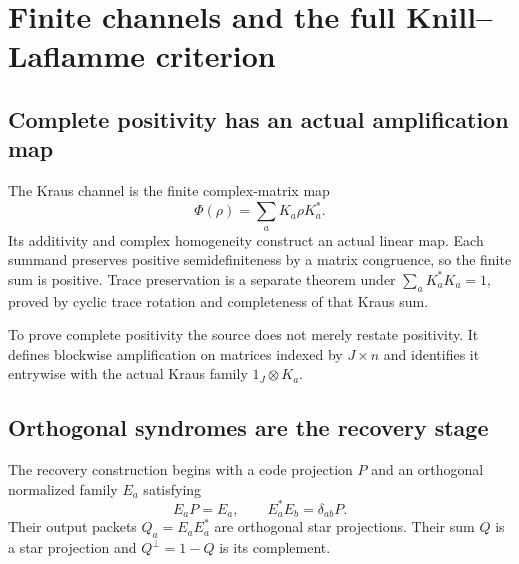 \section{Finite channels and the full Knill--Laflamme criterion}
\label{sec:recovery}

\subsection{Complete positivity has an actual amplification map}
The Kraus channel is the finite complex-matrix map
\[
\Phi(\rho)=\sum_aK_a\rho K_a^*.
\]
Its additivity and complex homogeneity construct an actual linear map. Each summand preserves positive semidefiniteness by a matrix congruence, so the finite sum is positive. Trace preservation is a separate theorem under $\sum_aK_a^*K_a=1$, proved by cyclic trace rotation and completeness of that Kraus sum.

To prove complete positivity the source does not merely restate positivity. It defines blockwise amplification on matrices indexed by $J\times n$ and identifies it entrywise with the actual Kraus family $1_J\otimes K_a$.




\subsection{Orthogonal syndromes are the recovery stage}
The recovery construction begins with a code projection $P$ and an orthogonal normalized family $E_a$ satisfying
\[
E_aP=E_a,\qquad E_a^*E_b=\delta_{ab}P.
\]
Their output packets $Q_a=E_aE_a^*$ are orthogonal star projections. Their sum $Q$ is a star projection and $Q^\perp=1-Q$ is its complement.

